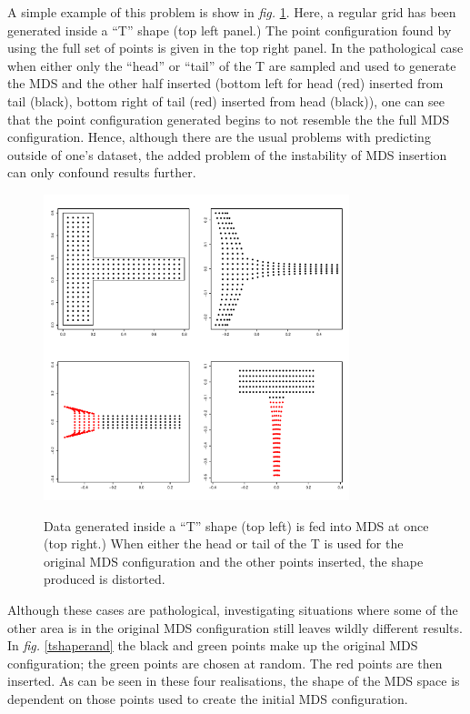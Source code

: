 \documentclass[a4paper,10pt]{article}
\newcommand{\fig}[1]{\emph{fig.} \ref{#1}}
\begin{document}
A simple example of this problem is show in \fig{tshape}. Here, a regular grid has been generated inside a ``T'' shape (top left panel.) The point configuration found by using the full set of points is given in the top right panel. In the pathological case when either only the ``head'' or ``tail'' of the T are sampled and used to generate the MDS and the other half inserted (bottom left for head (red) inserted from tail (black), bottom right of tail (red) inserted from head (black)), one can see that the point configuration generated begins to not resemble the the full MDS configuration. Hence, although there are the usual problems with predicting outside of one's dataset, the added problem of the instability of MDS insertion can only confound results further.

\begin{figure}
\centering
\includegraphics[width=3.5in]{figs/tshape.pdf} \\
\caption{Data generated inside a ``T'' shape (top left) is fed into MDS at once (top right.) When either the head or tail of the T is used for the original MDS configuration and the other points inserted, the shape produced is distorted.}
\label{tshape}
\end{figure}

Although these cases are pathological, investigating situations where some of the other area is in the original MDS configuration still leaves wildly different results. In \fig{tshaperand} the black and green points make up the original MDS configuration; the green points are chosen at random. The red points are then inserted. As can be seen in these four realisations, the shape of the MDS space is dependent on those points used to create the initial MDS configuration.
\end{document}
